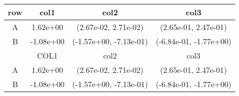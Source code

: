\begin{tabular}{cccc}
\toprule
row&col1&col2&col3\tabularnewline
\midrule
A&1.62e+00& (2.67e-02, 2.71e-02)& (2.65e-01, 2.47e-01)\tabularnewline
B&-1.08e+00& (-1.57e+00, -7.13e-01)& (-6.84e-01, -1.77e+00)\tabularnewline
\midrule
&COL1&col2&col3\tabularnewline
\midrule
A&1.62e+00& (2.67e-02, 2.71e-02)& (2.65e-01, 2.47e-01)\tabularnewline
B&-1.08e+00& (-1.57e+00, -7.13e-01)& (-6.84e-01, -1.77e+00)\tabularnewline
\bottomrule
\end{tabular}
